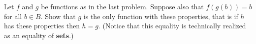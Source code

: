 Let $f$ and $g$ be functions as in the last problem. Suppose also that $f(g(b)) = b$ for all $b \in B$. Show that $g$ is the only function with these properties, that is if $h$ has these properties then $h = g$. (Notice that this equality is technically realized as an equality of \textbf{sets}.)